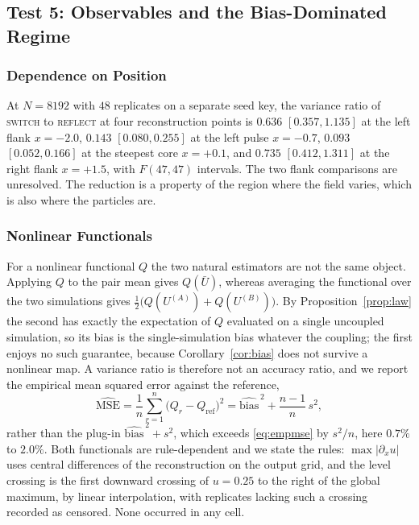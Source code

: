 \documentclass[smallextended,nospthms]{svjour3}
\theoremstyle{plain}
\theoremstyle{definition}
\theoremstyle{remark}
\numberwithin{equation}{section}
\newcommand{\refl}{\textnormal{\textsc{reflect}}}
\newcommand{\swi}{\textnormal{\textsc{switch}}}
\begin{document}
\subsection{Test 5: Observables and the Bias-Dominated Regime}
\label{sec:observables}

\subsubsection{Dependence on Position}

At $N=8192$ with $48$ replicates on a separate seed key, the variance ratio of
\swi{} to \refl{} at four reconstruction points is $0.636$ $[0.357,1.135]$ at
the left flank $x=-2.0$, $0.143$ $[0.080,0.255]$ at the left pulse $x=-0.7$,
$0.093$ $[0.052,0.166]$ at the steepest core $x=+0.1$, and $0.735$
$[0.412,1.311]$ at the right flank $x=+1.5$, with $F(47,47)$ intervals. The two
flank comparisons are unresolved. The reduction is a property of the region
where the field varies, which is also where the particles are.

\subsubsection{Nonlinear Functionals}

For a nonlinear functional $Q$ the two natural estimators are not the same
object. Applying $Q$ to the pair mean gives $Q(\bar U)$, whereas averaging the
functional over the two simulations gives
$\tfrac12\bigl(Q(U^{(A)})+Q(U^{(B)})\bigr)$. By Proposition~\ref{prop:law} the
second has exactly the expectation of $Q$ evaluated on a single uncoupled
simulation, so its bias is the single-simulation bias whatever the coupling;
the first enjoys no such guarantee, because Corollary~\ref{cor:bias} does not
survive a nonlinear map. A variance ratio is therefore not an accuracy ratio,
and we report the empirical mean squared error against the reference,
\begin{equation}
  \widehat{\mathrm{MSE}}
  =\frac1n\sum_{r=1}^{n}\bigl(Q_r-Q_{\mathrm{ref}}\bigr)^2
  =\widehat{\mathrm{bias}}^{\,2}+\frac{n-1}{n}\,s^2 ,
  \label{eq:empmse}
\end{equation}
rather than the plug-in $\widehat{\mathrm{bias}}^{\,2}+s^2$, which exceeds
\eqref{eq:empmse} by $s^2/n$, here $0.7\%$ to $2.0\%$. Both functionals are
rule-dependent and we state the rules: $\max|\partial_x u|$ uses central
differences of the reconstruction on the output grid, and the level crossing is
the first downward crossing of $u=0.25$ to the right of the global maximum, by
linear interpolation, with replicates lacking such a crossing recorded as
censored. None occurred in any cell.
\end{document}
